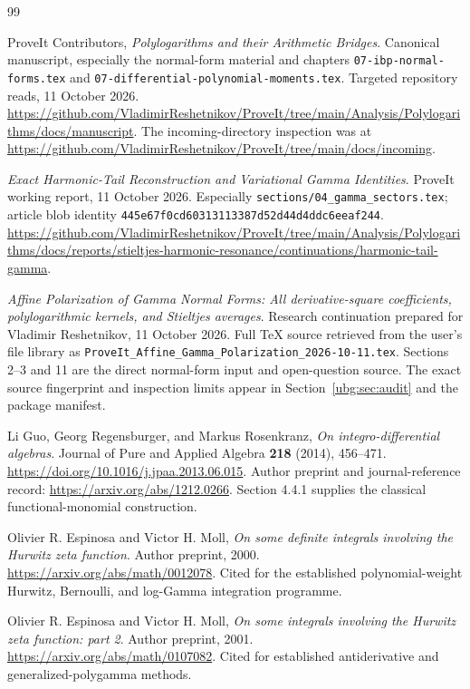 \documentclass[11pt,letterpaper]{article}
\numberwithin{equation}{section}
\theoremstyle{definition}\newtheorem{definition}[theorem]{Definition}
\theoremstyle{remark}\newtheorem{remark}[theorem]{Remark}
\newcommand{\src}[1]{\nolinkurl{#1}}
\begin{document}
\begin{thebibliography}{99}
\raggedright
{}
ProveIt Contributors, \emph{Polylogarithms and their Arithmetic Bridges}.
Canonical manuscript, especially the normal-form material and chapters
\src{07-ibp-normal-forms.tex} and
\src{07-differential-polynomial-moments.tex}.
Targeted repository reads, 11 October 2026.
\url{https://github.com/VladimirReshetnikov/ProveIt/tree/main/Analysis/Polylogarithms/docs/manuscript}.
The incoming-directory inspection was at
\url{https://github.com/VladimirReshetnikov/ProveIt/tree/main/docs/incoming}.

\emph{Exact Harmonic-Tail Reconstruction and Variational Gamma Identities}.
ProveIt working report, 11 October 2026. Especially
\src{sections/04_gamma_sectors.tex}; article blob identity
\src{445e67f0cd60313113387d52d44d4ddc6eeaf244}.
\url{https://github.com/VladimirReshetnikov/ProveIt/tree/main/Analysis/Polylogarithms/docs/reports/stieltjes-harmonic-resonance/continuations/harmonic-tail-gamma}.

\emph{Affine Polarization of Gamma Normal Forms: All derivative-square
coefficients, polylogarithmic kernels, and Stieltjes averages}.
Research continuation prepared for Vladimir Reshetnikov, 11 October 2026.
Full TeX source retrieved from the user's file library as
\src{ProveIt_Affine_Gamma_Polarization_2026-10-11.tex}.
Sections 2--3 and 11 are the direct normal-form input and open-question
source. The exact source fingerprint and inspection limits appear in
Section~\ref{ubg:sec:audit} and the package manifest.

Li Guo, Georg Regensburger, and Markus Rosenkranz,
\emph{On integro-differential algebras}.
Journal of Pure and Applied Algebra \textbf{218} (2014), 456--471.
\url{https://doi.org/10.1016/j.jpaa.2013.06.015}.
Author preprint and journal-reference record:
\url{https://arxiv.org/abs/1212.0266}.
Section 4.4.1 supplies the classical functional-monomial construction.

Olivier R. Espinosa and Victor H. Moll,
\emph{On some definite integrals involving the Hurwitz zeta function}.
Author preprint, 2000.
\url{https://arxiv.org/abs/math/0012078}.
Cited for the established polynomial-weight Hurwitz, Bernoulli,
and log-Gamma integration programme.

Olivier R. Espinosa and Victor H. Moll,
\emph{On some integrals involving the Hurwitz zeta function: part 2}.
Author preprint, 2001.
\url{https://arxiv.org/abs/math/0107082}.
Cited for established antiderivative and generalized-polygamma methods.


\end{thebibliography}
\end{document}
